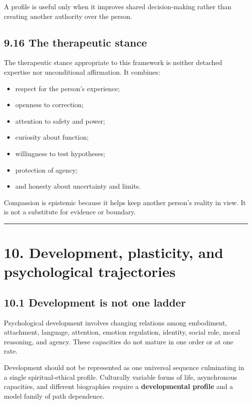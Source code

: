 \documentclass[
  11pt,
]{article}
\providecommand{\tightlist}{%
  \setlength{\itemsep}{0pt}\setlength{\parskip}{0pt}}
\begin{document}
A profile is useful only when it improves shared decision-making rather
than creating another authority over the person.

\subsection{9.16 The therapeutic stance}\label{the-therapeutic-stance}

The therapeutic stance appropriate to this framework is neither detached
expertise nor unconditional affirmation. It combines:

\begin{itemize}
\tightlist
\item
  respect for the person's experience;
\item
  openness to correction;
\item
  attention to safety and power;
\item
  curiosity about function;
\item
  willingness to test hypotheses;
\item
  protection of agency;
\item
  and honesty about uncertainty and limits.
\end{itemize}

Compassion is epistemic because it helps keep another person's reality
in view. It is not a substitute for evidence or boundary.

\begin{center}\rule{0.5\linewidth}{0.5pt}\end{center}

\section{10. Development, plasticity, and psychological
trajectories}\label{development-plasticity-and-psychological-trajectories}

\subsection{10.1 Development is not one
ladder}\label{development-is-not-one-ladder}

Psychological development involves changing relations among embodiment,
attachment, language, attention, emotion regulation, identity, social
role, moral reasoning, and agency. These capacities do not mature in one
order or at one rate.

Development should not be represented as one universal sequence
culminating in a single spiritual-ethical profile. Culturally variable
forms of life, asynchronous capacities, and different biographies
require a \textbf{developmental profile} and a model family of path
dependence.
\end{document}
